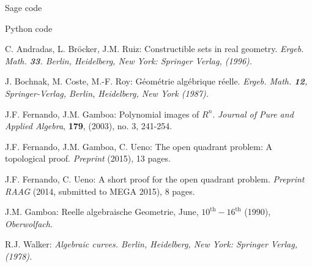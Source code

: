 \documentclass[11pt, a4paper, english, twoside, notitlepage, openright]{report}
\begin{document}
\begin{chapter}{Sage code}

\end{chapter}

\begin{chapter}{Python code}

\end{chapter}

\begin{thebibliography}{10}

 C. Andradas, L. Br\"ocker, J.M. Ruiz: Constructible 
sets in real geometry. \em Ergeb. Math. \em{\bf 33}. Berlin, Heidelberg, 
New York: Springer Verlag, (1996).

 J. Bochnak, M. Coste, M.-F. Roy: G\'eom\'etrie
alg\'ebrique r\'eelle. \em Ergeb. Math. \em {\bf 12}, Springer-Verlag,
Berlin, Heidelberg, New York (1987).

 J.F. Fernando, J.M. Gamboa: Polynomial images of $R^n$.
\textit{Journal of Pure and Applied Algebra}, {\bf 179}, (2003), no. 3, 241-254.

 J.F. Fernando, J.M. Gamboa, C. Ueno: The open quadrant problem:
A topological proof. \textit{Preprint} (2015), 13 pages.

 J.F. Fernando, C. Ueno: A short proof for the open quadrant problem.
\textit{Preprint RAAG} (2014, submitted to MEGA 2015), 8 pages.

 J.M. Gamboa: Reelle algebraische Geometrie, June,
$10^{\text{th}}-16^{\text{th}}$ (1990), \textit{Oberwolfach}.

 R.J. Walker: \em Algebraic curves. \em Berlin, Heidelberg, 
New York: Springer Verlag, (1978).



\end{thebibliography}
\end{document}
